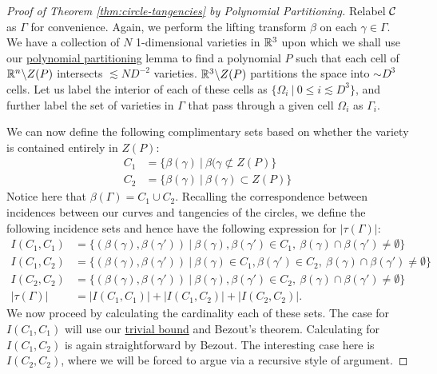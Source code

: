 \begin{proof}[Proof of Theorem \ref{thm:circle-tangencies} by Polynomial Partitioning]
Relabel $\mathcal C$ as $\Gamma$ for convenience. Again, we perform the lifting transform $\beta$ on each $\gamma \in \Gamma$. 
We have a collection of $N$ 1-dimensional varieties in $\mathbb R^3$ upon which we shall use our \hyperref[lem:poly-part-var]{polynomial partitioning} lemma
to find a polynomial $P$ such that each cell of $\mathbb R^n \backslash Z(P)$ intersects $\lesssim N D^{-2}$ varieties. 
$\mathbb R^3 \backslash Z(P)$ partitions the space into $\sim D^3$ cells. 
Let us label the interior of each of these cells as $\{\Omega_i \ | \ 0 \leq i \lesssim D^3 \}$, and further label the set of varieties in $\Gamma$ that pass through a given cell $\Omega_i$ as $\Gamma_i$.

We can now define the following complimentary sets based on whether the variety is contained entirely in $Z(P)$:
\begin{align*}
    C_1 &= \{ \beta(\gamma) \ |\ \beta(\gamma \not \subset Z(P) \}\\
    C_2 &= \{ \beta(\gamma) \ |\ \beta(\gamma)  \subset Z(P) \}
\end{align*}
Notice here that $\beta(\Gamma) = C_1 \cup C_2$. Recalling the correspondence between incidences between our curves and tangencies of the circles, we define the following
incidence sets and hence have the following expression for $|\tau(\Gamma)|$:
\begin{align*}
    I(C_1, C_1) &= \{(\beta(\gamma), \beta(\gamma')) \ |  \ \beta(\gamma), \beta(\gamma') \in C_1, \ \beta(\gamma) \cap \beta(\gamma') \neq \emptyset \} \\
    I(C_1, C_2) &= \{(\beta(\gamma), \beta(\gamma')) \ |  \ \beta(\gamma)\in C_1, \beta(\gamma') \in C_2, \ \beta(\gamma) \cap \beta(\gamma') \neq \emptyset \} \\
    I(C_2, C_2) &= \{(\beta(\gamma), \beta(\gamma')) \ |  \ \beta(\gamma), \beta(\gamma') \in C_2, \ \beta(\gamma) \cap \beta(\gamma') \neq \emptyset \} \\
    |\tau(\Gamma)| &= |I(C_1, C_1)| + |I(C_1, C_2)| + |I(C_2, C_2)|.
\end{align*}
We now proceed by calculating the cardinality each of these sets. The case for $I(C_1,C_1)$ will use our \hyperref[thm:trivial-circle-bound]{trivial bound} and Bezout's
theorem. Calculating for $I(C_1,C_2)$ is again straightforward by Bezout. 
The interesting case here is $I(C_2,C_2)$, where we will be forced to argue via a recursive style of argument.


\end{proof}
